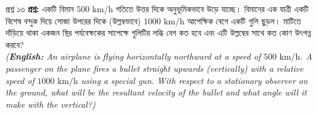 \documentclass[11pt,a4paper]{article}
\begin{document}
\vspace{0.4cm}

\begin{qbox}{প্রশ্ন ১৩}
\textbf{প্রশ্ন:} একটি বিমান $500\text{ km/h}$ গতিতে উত্তর দিকে অনুভূমিকভাবে উড়ে যাচ্ছে। বিমানের এক যাত্রী একটি বিশেষ বন্দুক দিয়ে সোজা উপরের দিকে (উল্লম্বভাবে) $1000\text{ km/h}$ আপেক্ষিক বেগে একটি গুলি ছুড়ল। মাটিতে দাঁড়িয়ে থাকা একজন স্থির পর্যবেক্ষকের সাপেক্ষে গুলিটির লব্ধি বেগ কত হবে এবং এটি উল্লম্বের সাথে কত কোণ উৎপন্ন করবে? \\
\textit{(\textbf{English:} An airplane is flying horizontally northward at a speed of $500\text{ km/h}$. A passenger on the plane fires a bullet straight upwards (vertically) with a relative speed of $1000\text{ km/h}$ using a special gun. With respect to a stationary observer on the ground, what will be the resultant velocity of the bullet and what angle will it make with the vertical?)}
\end{qbox}
\end{document}

